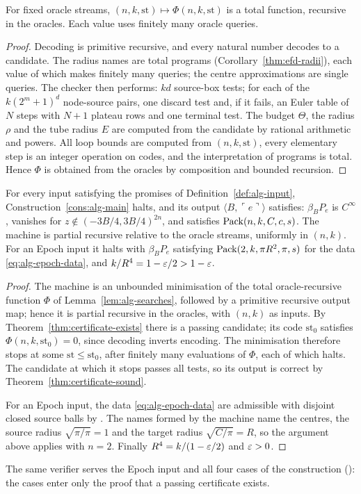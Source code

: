 \begin{lemma}\label{lem:alg-searches}
For fixed oracle streams, $(n,k,\mathrm{st})\mapsto\Phi(n,k,\mathrm{st})$ is a total function, recursive in the
oracles. Each value uses finitely many oracle queries.
\end{lemma}

\begin{proof}
Decoding is primitive recursive, and every natural number decodes to a candidate. The radius names are total programs
(Corollary~\ref{thm:efd-radii}), each value of which makes finitely many queries; the centre approximations are single
queries. The checker then performs: $kd$ source-box tests; for each of the $k(2^m+1)^d$ node-source pairs, one discard
test and, if it fails, an Euler table of $N$ steps with $N+1$ plateau rows and one terminal test. The budget $\Theta$,
the radius $\rho$ and the tube radius $E$ are computed from the candidate by rational arithmetic and powers. All loop
bounds are computed from $(n,k,\mathrm{st})$, every elementary step is an integer operation on codes, and the
interpretation of programs is total. Hence $\Phi$ is obtained from the oracles by composition and bounded recursion.
\end{proof}

\begin{theorem}\label{thm:alg-main}
For every input satisfying the promises of Definition~\ref{def:alg-input}, Construction~\ref{cons:alg-main} halts,
and its output $\langle B,\ulcorner e\urcorner\rangle$ satisfies: $\beta_BP_e$ is $C^\infty$, vanishes for
$z\notin(-3B/4,3B/4)^{2n}$, and satisfies $\mathrm{Pack}(n,k,C,c,s)$. The machine is partial recursive relative to the oracle
streams, uniformly in $(n,k)$. For an Epoch input it halts with $\beta_BP_e$ satisfying $\mathrm{Pack}(2,k,\pi R^2,\pi,s)$ for
the data \eqref{eq:alg-epoch-data}, and $k/R^4=1-\varepsilon/2>1-\varepsilon$.
\end{theorem}

\begin{proof}
The machine is an unbounded minimisation of the total oracle-recursive function $\Phi$ of
Lemma~\ref{lem:alg-searches}, followed by a primitive recursive output map; hence it is partial recursive in the
oracles, with $(n,k)$ as inputs. By Theorem~\ref{thm:certificate-exists} there is a passing candidate; its code
$\mathrm{st}_0$ satisfies $\Phi(n,k,\mathrm{st}_0)=0$, since decoding inverts encoding. The minimisation therefore stops at
some $\mathrm{st}\le\mathrm{st}_0$, after finitely many evaluations of $\Phi$, each of which halts. The candidate at
which it stops passes all tests, so its output is correct by Theorem~\ref{thm:certificate-sound}.

For an Epoch input, the data \eqref{eq:alg-epoch-data} are admissible with disjoint closed source balls by
. The names formed by the machine name the centres, the source radius
$\sqrt{\pi/\pi}=1$ and the target radius $\sqrt{C/\pi}=R$, so the argument above applies with $n=2$. Finally
$R^4=k/(1-\varepsilon/2)$ and $\varepsilon>0$.
\end{proof}

\begin{remark}\label{rem:alg-epoch}
The same verifier serves the Epoch input and all four cases of the construction ():
the cases enter only the proof that a passing certificate exists.
\end{remark}
